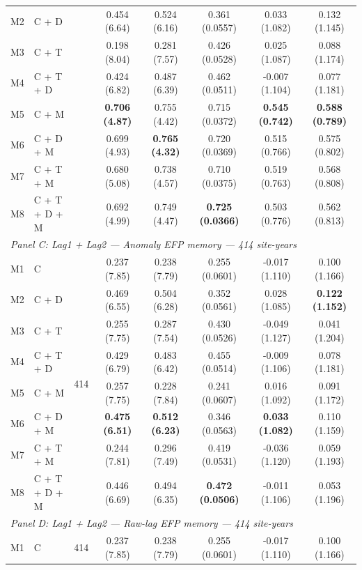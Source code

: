 \begin{table}[htbp]
\begin{tabular}{llcccccc}
M2 & C + D &  & 0.454 (6.64) & 0.524 (6.16) & 0.361 (0.0557) & 0.033 (1.082) & 0.132 (1.145) \\
M3 & C + T &  & 0.198 (8.04) & 0.281 (7.57) & 0.426 (0.0528) & 0.025 (1.087) & 0.088 (1.174) \\
M4 & C + T + D &  & 0.424 (6.82) & 0.487 (6.39) & 0.462 (0.0511) & -0.007 (1.104) & 0.077 (1.181) \\
M5 & C + M &  & \textbf{0.706 (4.87)} & 0.755 (4.42) & 0.715 (0.0372) & \textbf{0.545 (0.742)} & \textbf{0.588 (0.789)} \\
M6 & C + D + M &  & 0.699 (4.93) & \textbf{0.765 (4.32)} & 0.720 (0.0369) & 0.515 (0.766) & 0.575 (0.802) \\
M7 & C + T + M &  & 0.680 (5.08) & 0.738 (4.57) & 0.710 (0.0375) & 0.519 (0.763) & 0.568 (0.808) \\
M8 & C + T + D + M &  & 0.692 (4.99) & 0.749 (4.47) & \textbf{0.725 (0.0366)} & 0.503 (0.776) & 0.562 (0.813) \\
\midrule
\multicolumn{8}{l}{\textit{Panel C: Lag1 + Lag2 --- Anomaly EFP memory --- 414 site-years}} \\
\midrule
M1 & C & \multirow{8}{*}{414} & 0.237 (7.85) & 0.238 (7.79) & 0.255 (0.0601) & -0.017 (1.110) & 0.100 (1.166) \\
M2 & C + D &  & 0.469 (6.55) & 0.504 (6.28) & 0.352 (0.0561) & 0.028 (1.085) & \textbf{0.122 (1.152)} \\
M3 & C + T &  & 0.255 (7.75) & 0.287 (7.54) & 0.430 (0.0526) & -0.049 (1.127) & 0.041 (1.204) \\
M4 & C + T + D &  & 0.429 (6.79) & 0.483 (6.42) & 0.455 (0.0514) & -0.009 (1.106) & 0.078 (1.181) \\
M5 & C + M &  & 0.257 (7.75) & 0.228 (7.84) & 0.241 (0.0607) & 0.016 (1.092) & 0.091 (1.172) \\
M6 & C + D + M &  & \textbf{0.475 (6.51)} & \textbf{0.512 (6.23)} & 0.346 (0.0563) & \textbf{0.033 (1.082)} & 0.110 (1.159) \\
M7 & C + T + M &  & 0.244 (7.81) & 0.296 (7.49) & 0.419 (0.0531) & -0.036 (1.120) & 0.059 (1.193) \\
M8 & C + T + D + M &  & 0.446 (6.69) & 0.494 (6.35) & \textbf{0.472 (0.0506)} & -0.011 (1.106) & 0.053 (1.196) \\
\midrule
\multicolumn{8}{l}{\textit{Panel D: Lag1 + Lag2 --- Raw-lag EFP memory --- 414 site-years}} \\
\midrule
M1 & C & \multirow{8}{*}{414} & 0.237 (7.85) & 0.238 (7.79) & 0.255 (0.0601) & -0.017 (1.110) & 0.100 (1.166) \\

\end{tabular}
\end{table}
